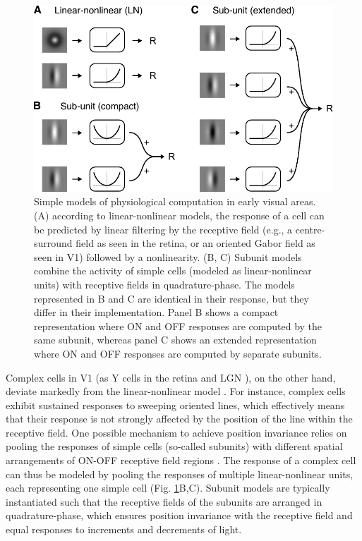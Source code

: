 \begin{figure}
  \centering
  \includegraphics{early-models}
  \caption[Models of physiological computation in early visual areas.]{Simple models of physiological computation in early visual areas. (A) according to linear-nonlinear models, the response of a cell can be predicted by linear filtering by the receptive field (e.g., a centre-surround field as seen in the retina, or an oriented Gabor field as seen in V1) followed by a nonlinearity. (B, C) Subunit models combine the activity of simple cells (modeled as linear-nonlinear units) with receptive fields in quadrature-phase. The models represented in B and C are identical in their response, but they differ in their implementation. Panel B shows a compact representation where ON and OFF responses are computed by the same subunit, whereas panel C shows an extended representation where ON and OFF responses are computed by separate subunits.}
  \label{fig:earlymodels}
\end{figure}

Complex cells in V1 (as Y cells in the retina \cite{Enroth-Cugell:1966zr,Hochstein:1976ly} and LGN \cite{Shapley:1975aa}), on the other hand, deviate markedly from the linear-nonlinear model \cite{Movshon:1978bh}. For instance, complex cells exhibit sustained responses to sweeping oriented lines, which effectively means that their response is not strongly affected by the position of the line within the receptive field. One possible mechanism to achieve position invariance relies on pooling the responses of simple cells (so-called subunits) with different spatial arrangements of ON-OFF receptive field regions \cite{HUBEL:1962ti,Hochstein:1976ly,Movshon:1978bh}. The response of a complex cell can thus be modeled by pooling the responses of multiple linear-nonlinear units, each representing one simple cell (Fig. \ref{fig:earlymodels}B,C). Subunit models are typically instantiated such that the receptive fields of the subunits are arranged in quadrature-phase, which ensures position invariance with the receptive field and equal responses to increments and decrements of light.

